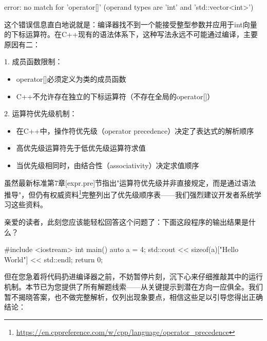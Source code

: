 \begin{shell}
error: no match for 'operator[]' (operand types are 'int' and 'std::vector<int>')
\end{shell}

这个错误信息直白地说就是：编译器找不到一个能接受整型参数并应用于int向量的下标运算符。在C++现有的语法体系下，这种写法永远不可能通过编译，主要原因有二：

1. 成员函数限制：

\begin{itemize}
\item 
operator[]必须定义为类的成员函数

\item 
C++不允许存在独立的下标运算符（不存在全局的operator[]）
\end{itemize}

2. 运算符优先级机制：

\begin{itemize}
\item 
在C++中，操作符优先级（operator precedence）决定了表达式的解析顺序

\item 
高优先级运算符先于低优先级运算符求值

\item 
当优先级相同时，由结合性（associativity）决定求值顺序
\end{itemize}

虽然最新标准第7章[expr.pre]节指出"运算符优先级并非直接规定，而是通过语法推导"，但仍有权威资料\footnote{\url{https://en.cppreference.com/w/cpp/language/operator_precedence}}完整列出了优先级顺序表——我们强烈建议开发者系统学习这些资料。


亲爱的读者，此刻您应该能轻松回答这个问题了：下面这段程序的输出结果是什么？

\begin{cpp}
#include <iostream>
int main() {
  auto a = 4;
  std::cout << sizeof(a)["Hello World"] << std::endl;
  return 0;
}
\end{cpp}

但在您急着将代码扔进编译器之前，不妨暂停片刻，沉下心来仔细推敲其中的运行机制。本节已为您提供了所有解题线索——从关键提示到潜在方向一应俱全。我们暂不揭晓答案，也不做完整解析，仅列出现象要点，相信这些足以引导您得出正确结论：

